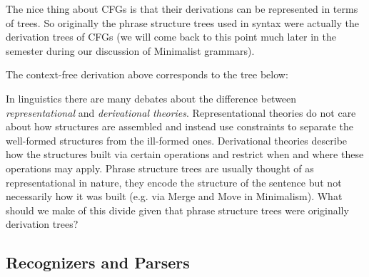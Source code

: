 The nice thing about CFGs is that their derivations can be represented in terms of trees.
So originally the phrase structure trees used in syntax were actually the derivation trees of CFGs (we will come back to this point much later in the semester during our discussion of Minimalist grammars).
%
\begin{examplebox}
    The context-free derivation above corresponds to the tree below:
    \begin{center}
    \end{center}
\end{examplebox}
%
\begin{exercise}
    In linguistics there are many debates about the difference between \emph{representational} and \emph{derivational theories}.
    Representational theories do not care about how structures are assembled and instead use constraints to separate the well-formed structures from the ill-formed ones.
    Derivational theories describe how the structures built via certain operations and restrict when and where these operations may apply.
    Phrase structure trees are usually thought of as representational in nature, they encode the structure of the sentence but not necessarily how it was built (e.g. via Merge and Move in Minimalism).
    What should we make of this divide given that phrase structure trees were originally derivation trees?
\end{exercise}


\subsection{Recognizers and Parsers}
\label{sub:BigPicture_Parsing}

